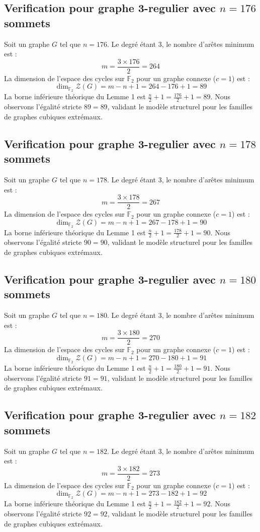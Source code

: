 \documentclass[11pt,a4paper]{article}
\begin{document}
\subsection{Verification pour graphe 3-regulier avec $n=176$ sommets}
Soit un graphe $G$ tel que $n = 176$. Le degré étant 3, le nombre d'arêtes minimum est :
$$ m = \frac{3 \times 176}{2} = 264 $$
La dimension de l'espace des cycles sur $\mathbb{F}_2$ pour un graphe connexe ($c=1$) est :
$$ \dim_{\mathbb{F}_2} \mathcal{Z}(G) = m - n + 1 = 264 - 176 + 1 = 89 $$
La borne inférieure théorique du Lemme 1 est $\frac{n}{2} + 1 = \frac{176}{2} + 1 = 89$.
Nous observons l'égalité stricte $89 = 89$, validant le modèle structurel pour les familles de graphes cubiques extrémaux.

\subsection{Verification pour graphe 3-regulier avec $n=178$ sommets}
Soit un graphe $G$ tel que $n = 178$. Le degré étant 3, le nombre d'arêtes minimum est :
$$ m = \frac{3 \times 178}{2} = 267 $$
La dimension de l'espace des cycles sur $\mathbb{F}_2$ pour un graphe connexe ($c=1$) est :
$$ \dim_{\mathbb{F}_2} \mathcal{Z}(G) = m - n + 1 = 267 - 178 + 1 = 90 $$
La borne inférieure théorique du Lemme 1 est $\frac{n}{2} + 1 = \frac{178}{2} + 1 = 90$.
Nous observons l'égalité stricte $90 = 90$, validant le modèle structurel pour les familles de graphes cubiques extrémaux.

\subsection{Verification pour graphe 3-regulier avec $n=180$ sommets}
Soit un graphe $G$ tel que $n = 180$. Le degré étant 3, le nombre d'arêtes minimum est :
$$ m = \frac{3 \times 180}{2} = 270 $$
La dimension de l'espace des cycles sur $\mathbb{F}_2$ pour un graphe connexe ($c=1$) est :
$$ \dim_{\mathbb{F}_2} \mathcal{Z}(G) = m - n + 1 = 270 - 180 + 1 = 91 $$
La borne inférieure théorique du Lemme 1 est $\frac{n}{2} + 1 = \frac{180}{2} + 1 = 91$.
Nous observons l'égalité stricte $91 = 91$, validant le modèle structurel pour les familles de graphes cubiques extrémaux.

\subsection{Verification pour graphe 3-regulier avec $n=182$ sommets}
Soit un graphe $G$ tel que $n = 182$. Le degré étant 3, le nombre d'arêtes minimum est :
$$ m = \frac{3 \times 182}{2} = 273 $$
La dimension de l'espace des cycles sur $\mathbb{F}_2$ pour un graphe connexe ($c=1$) est :
$$ \dim_{\mathbb{F}_2} \mathcal{Z}(G) = m - n + 1 = 273 - 182 + 1 = 92 $$
La borne inférieure théorique du Lemme 1 est $\frac{n}{2} + 1 = \frac{182}{2} + 1 = 92$.
Nous observons l'égalité stricte $92 = 92$, validant le modèle structurel pour les familles de graphes cubiques extrémaux.
\end{document}
